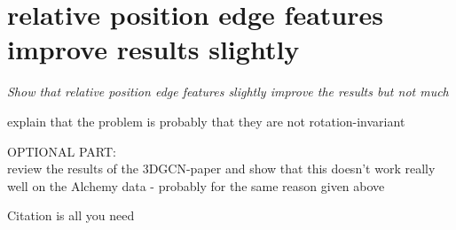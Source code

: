 \section{relative position edge features improve results slightly}

{\itshape
 Show that relative position edge features slightly improve the results but not much
 
 explain that the problem is probably that they are not rotation-invariant
	
	
OPTIONAL PART:\\
review the results of the 3DGCN-paper and show that this doesn't work really well on the Alchemy data - probably for the same reason given above
}

Citation is all you need~\cite{Vaswani2017}





